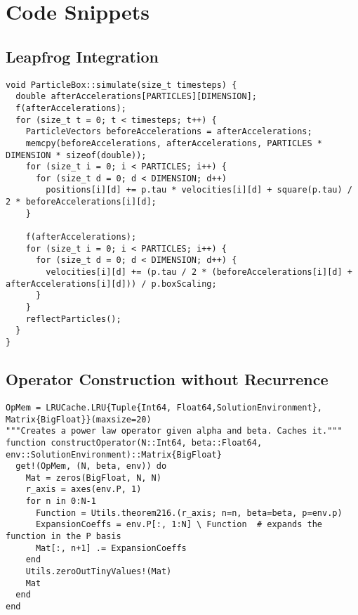 
\chapter{Code Snippets}
\label{appendix:code-snippets}

\section{Leapfrog Integration}
\begin{verbatim}
void ParticleBox::simulate(size_t timesteps) {
  double afterAccelerations[PARTICLES][DIMENSION];
  f(afterAccelerations);
  for (size_t t = 0; t < timesteps; t++) {
    ParticleVectors beforeAccelerations = afterAccelerations;
    memcpy(beforeAccelerations, afterAccelerations, PARTICLES * DIMENSION * sizeof(double));
    for (size_t i = 0; i < PARTICLES; i++) {
      for (size_t d = 0; d < DIMENSION; d++)
        positions[i][d] += p.tau * velocities[i][d] + square(p.tau) / 2 * beforeAccelerations[i][d];
    }

    f(afterAccelerations);
    for (size_t i = 0; i < PARTICLES; i++) {
      for (size_t d = 0; d < DIMENSION; d++) {
        velocities[i][d] += (p.tau / 2 * (beforeAccelerations[i][d] + afterAccelerations[i][d])) / p.boxScaling;
      }
    }
    reflectParticles();
  }
}
\end{verbatim}

\pagebreak
\section{Operator Construction without Recurrence}
\begin{verbatim}
OpMem = LRUCache.LRU{Tuple{Int64, Float64,SolutionEnvironment}, Matrix{BigFloat}}(maxsize=20)
"""Creates a power law operator given alpha and beta. Caches it."""
function constructOperator(N::Int64, beta::Float64, env::SolutionEnvironment)::Matrix{BigFloat}
  get!(OpMem, (N, beta, env)) do
    Mat = zeros(BigFloat, N, N)
    r_axis = axes(env.P, 1)
    for n in 0:N-1
      Function = Utils.theorem216.(r_axis; n=n, beta=beta, p=env.p)
      ExpansionCoeffs = env.P[:, 1:N] \ Function  # expands the function in the P basis
      Mat[:, n+1] .= ExpansionCoeffs
    end
    Utils.zeroOutTinyValues!(Mat)
    Mat
  end
end
\end{verbatim}
